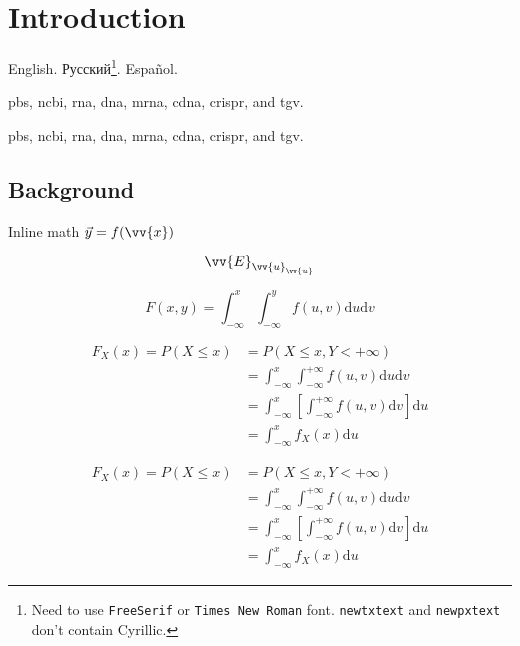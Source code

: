 \chapter{Introduction}
\label{ch1:Introduction}

English. \foreignlanguage{russian}{Русский}\footnote{Need to use \verb|FreeSerif| or \verb|Times New Roman| font. \verb|newtxtext| and \verb|newpxtext| don't contain Cyrillic.}. \foreignlanguage{spanish}{Español}.

\Gls{pbs}, \gls{ncbi}, \gls{rna}, \gls{dna}, \gls{mrna}, \gls{cdna}, \gls{crispr}, and \gls{tgv}.

\Gls{pbs}, \gls{ncbi}, \gls{rna}, \gls{dna}, \gls{mrna}, \gls{cdna}, \gls{crispr}, and \gls{tgv}.

\section{Background}
\label{ch1:sec:Background}

Inline math $\Vec{y}=f(\vv{x})$

\begin{equation}
    \vv{E}_{\vv{u}_{\vv{u}}}
\end{equation}

\begin{equation}\label{eq:joint_probability_distribution_function}
  F\left( x,y \right) =\int_{-\infty}^x{\int_{-\infty}^y{f\left( u,v \right) \text{d}u\text{d}v}}
\end{equation}

\begin{align}\label{eq:myalign}
  F_X\left( x \right) =P\left( X\leqslant x \right) & =P\left( X\leqslant x,Y<+\infty \right) \\
                                                    & =\int_{-\infty}^x{\int_{-\infty}^{+\infty}{f\left( u,v \right) \text{d}u\text{d}v}} \\
                                                    & =\int_{-\infty}^x{\left[ \int_{-\infty}^{+\infty}{f\left( u,v \right) \text{d}v} \right] \text{d}u}\\
                                                    & =\int_{-\infty}^x{f_X\left( x \right) \text{d}u}
\end{align}

\begin{equation}\label{eq:myeq}
  \begin{split}
  F_X\left( x \right) =P\left( X\leqslant x \right) & =P\left( X\leqslant x,Y<+\infty \right) \\
                                                    & =\int_{-\infty}^x{\int_{-\infty}^{+\infty}{f\left( u,v \right) \text{d}u\text{d}v}} \\
                                                    & =\int_{-\infty}^x{\left[ \int_{-\infty}^{+\infty}{f\left( u,v \right) \text{d}v} \right] \text{d}u}\\
                                                    & =\int_{-\infty}^x{f_X\left( x \right) \text{d}u}
  \end{split}
\end{equation}

